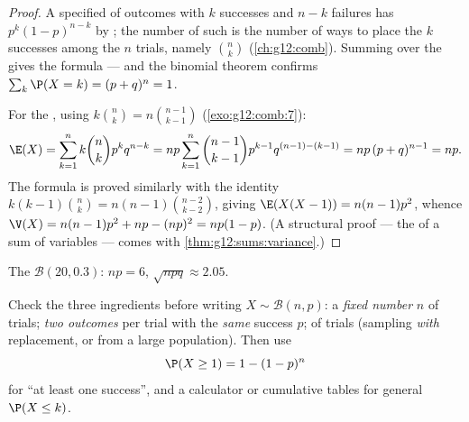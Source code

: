\begin{proof}
A specified  of outcomes with $k$ successes and $n-k$ failures has
 $p^k(1-p)^{n-k}$ by ; the number of such 
is the number of ways to place the $k$ successes among the $n$ trials,
namely $\binom nk$ (\cref{ch:g12:comb}). Summing over the  gives
the formula --- and the binomial theorem confirms
$\sum_k \P(X = k) = (p + q)^n = 1$.

For the , using $k\binom nk = n\binom{n-1}{k-1}$
(\cref{exo:g12:comb:7}):
\[
\E(X) = \sum_{k=1}^{n} k\binom nk p^k q^{n-k}
= np\sum_{k=1}^{n} \binom{n-1}{k-1} p^{k-1} q^{(n-1)-(k-1)}
= np\,(p + q)^{n-1} = np .
\]
The  formula is proved similarly with the identity
$k(k-1)\binom nk = n(n-1)\binom{n-2}{k-2}$, giving
$\E(X(X-1)) = n(n-1)p^2$, whence
$\V(X) = n(n-1)p^2 + np - (np)^2 = np(1-p)$. (A structural proof --- the
 of a sum of  variables --- comes with
\cref{thm:g12:sums:variance}.)
\end{proof}

\begin{omfigure}

{\small The  $\mathcal B(20, 0.3)$:  $np = 6$,  $\sqrt{npq} \approx 2.05$.}
\end{omfigure}

\begin{method}\label{met:g12:randvar:recognize}
Check the three ingredients before writing $X \sim \mathcal B(n,p)$: a
\emph{fixed number} $n$ of trials; \emph{two outcomes} per trial with the
\emph{same} success  $p$; \emph{} of trials
(sampling \emph{with} replacement, or from a large population). Then use
\[
\P(X \geq 1) = 1 - (1-p)^n
\]
for ``at least one success'', and a calculator or cumulative tables for
general $\P(X \leq k)$.
\end{method}

